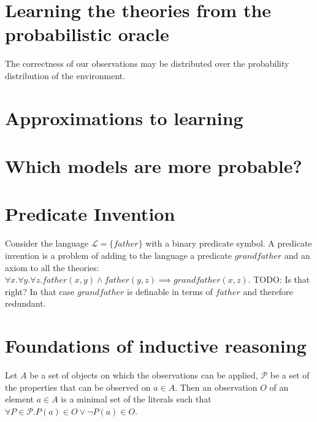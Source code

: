 \subsection{}

\section{Learning the theories from the probabilistic oracle}
The correctness of our observations may be distributed over the probability distribution of the environment.
\section{Approximations to learning}
\section{Which models are more probable?}
\section{Predicate Invention}
Consider the language $\mathcal{L}=\{father\}$ with a binary predicate symbol. A predicate invention is a problem of adding to the language a predicate $grandfather$ and an axiom to all the theories: $\forall x. \forall y. \forall z. father(x,y) \wedge father(y,z) \implies grandfather(x,z)$.
TODO: Is that right? In that case $grandfather$ is definable in terms of $father$ and therefore redundant.
\fi

\section{Foundations of inductive reasoning}
Let $A$ be a set of objects on which the observations can be applied, $\mathcal{P}$ be a set of the properties that can be observed on $a \in A$. Then an observation $O$ of an element $a \in A$ is a minimal set of the literals such that
$\forall P \in \mathcal{P}. P(a) \in O \vee \neg P(a) \in O$.
